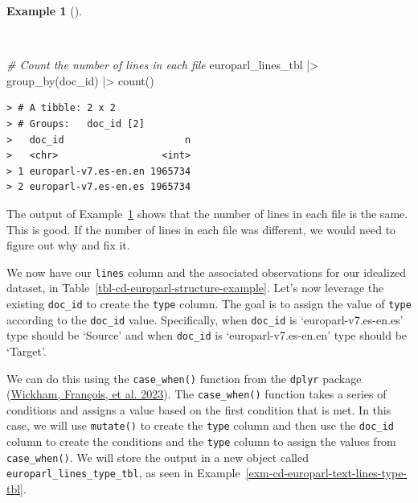 \documentclass[
  letterpaper,
  DIV=11,
  numbers=noendperiod]{scrreport}
\newenvironment{Shaded}{\begin{snugshade}}{\end{snugshade}}
\newcommand{\CommentTok}[1]{\textcolor[rgb]{0.00,0.00,0.00}{\textit{#1}}}
\newcommand{\FunctionTok}[1]{\textcolor[rgb]{0.00,0.00,0.00}{#1}}
\newcommand{\NormalTok}[1]{\textcolor[rgb]{0.00,0.00,0.00}{#1}}
\newcommand{\SpecialCharTok}[1]{\textcolor[rgb]{0.00,0.00,0.00}{#1}}
\theoremstyle{definition}
\newtheorem{example}{Example}[chapter]
\theoremstyle{remark}
\begin{document}
\begin{example}[]\protect\hypertarget{exm-cd-europarl-text-lines-tbl-count}{}\label{exm-cd-europarl-text-lines-tbl-count}

~

\begin{Shaded}
\begin{Highlighting}[]
\CommentTok{\# Count the number of lines in each file}
\NormalTok{europarl\_lines\_tbl }\SpecialCharTok{|\textgreater{}} 
  \FunctionTok{group\_by}\NormalTok{(doc\_id) }\SpecialCharTok{|\textgreater{}} 
  \FunctionTok{count}\NormalTok{()}
\end{Highlighting}
\end{Shaded}

\begin{verbatim}
> # A tibble: 2 x 2
> # Groups:   doc_id [2]
>   doc_id                     n
>   <chr>                  <int>
> 1 europarl-v7.es-en.en 1965734
> 2 europarl-v7.es-en.es 1965734
\end{verbatim}

\end{example}

The output of Example~\ref{exm-cd-europarl-text-lines-tbl-count} shows
that the number of lines in each file is the same. This is good. If the
number of lines in each file was different, we would need to figure out
why and fix it.

We now have our \texttt{lines} column and the associated observations
for our idealized dataset, in
Table~\ref{tbl-cd-europarl-structure-example}. Let's now leverage the
existing \texttt{doc\_id} to create the \texttt{type} column. The goal
is to assign the value of \texttt{type} according to the
\texttt{doc\_id} value. Specifically, when \texttt{doc\_id} is
`europarl-v7.es-en.es' type should be `Source' and when \texttt{doc\_id}
is `europarl-v7.es-en.en' type should be `Target'.

We can do this using the \texttt{case\_when()} function from the
\texttt{dplyr} package (\protect\hyperlink{ref-R-dplyr}{Wickham,
François, et al. 2023}). The \texttt{case\_when()} function takes a
series of conditions and assigns a value based on the first condition
that is met. In this case, we will use \texttt{mutate()} to create the
\texttt{type} column and then use the \texttt{doc\_id} column to create
the conditions and the \texttt{type} column to assign the values from
\texttt{case\_when()}. We will store the output in a new object called
\texttt{europarl\_lines\_type\_tbl}, as seen in
Example~\ref{exm-cd-europarl-text-lines-type-tbl}.
\end{document}
